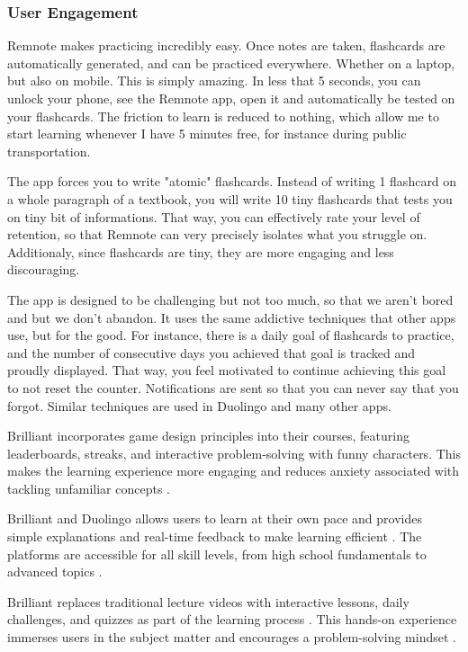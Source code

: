 \documentclass{article}
\begin{document}
\subsubsection{User Engagement}

Remnote makes practicing incredibly easy. Once notes are taken, flashcards
are automatically generated, and can be practiced everywhere.
Whether on a laptop, but also on mobile. This is simply amazing.
In less that 5 seconds, you can unlock your phone, see the Remnote app,
open it and automatically be tested on your flashcards.
The friction to learn is reduced to nothing, which allow me to start
learning whenever I have 5 minutes free, for instance during public
transportation.

The app forces you to write "atomic" flashcards. Instead of writing 1
flashcard on a whole paragraph of a textbook, you will write 10 tiny
flashcards that tests you on tiny bit of informations.
That way, you can effectively rate your level of retention,
so that Remnote can very precisely isolates what you struggle on.
Additionaly, since flashcards are tiny, they are more engaging and
less discouraging.

The app is designed to be challenging but not too much, so that
we aren't bored and but we don't abandon. It uses the same addictive
techniques that other apps use, but for the good. For instance,
there is a daily goal of flashcards to practice, and the number
of consecutive days you achieved that goal is tracked and proudly
displayed. That way, you feel motivated to continue achieving this
goal to not reset the counter. Notifications are sent so that
you can never say that you forgot.  Similar techniques are used in Duolingo
and many other apps.

Brilliant incorporates game design principles into their courses,
featuring leaderboards, streaks, and interactive problem-solving
with funny characters. This makes the learning experience more
engaging and reduces anxiety associated with tackling unfamiliar
concepts \cite{fordhamram_brilliant_review}.

Brilliant and Duolingo allows users to learn at their own
pace and provides simple explanations and real-time feedback
to make learning efficient \cite{fordhamram_brilliant_review}.
The platforms are accessible for all skill levels,
from high school fundamentals to advanced topics
\cite{fordhamram_brilliant_review}.

Brilliant replaces traditional lecture videos with interactive
lessons, daily challenges, and quizzes as part of the
learning process \cite{fordhamram_brilliant_review}.
This hands-on experience immerses users in the subject matter
and encourages a problem-solving mindset
\cite{edwize_brilliant_review}.
\end{document}
